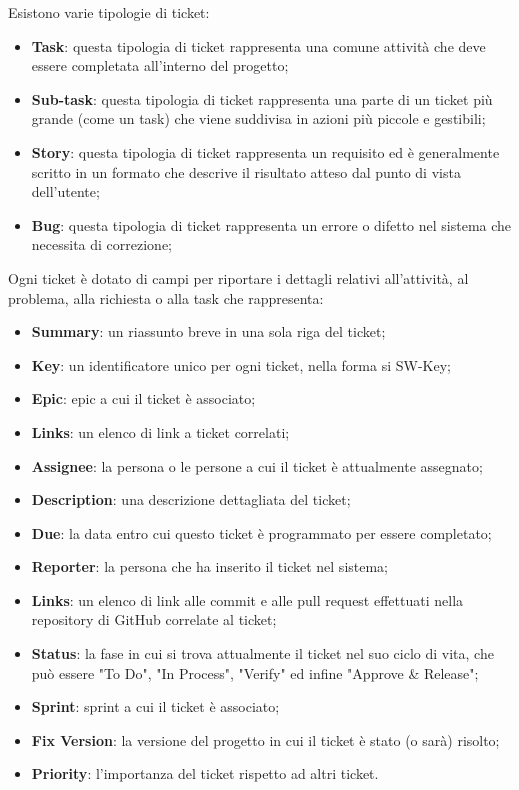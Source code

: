 Esistono varie tipologie di ticket:
\begin{itemize}
    \item \textbf{Task}: questa tipologia di ticket rappresenta una comune attività che deve essere completata all'interno del progetto;
    \item \textbf{Sub-task}: questa tipologia di ticket rappresenta una parte di un ticket più grande (come un task) che viene suddivisa in azioni più piccole e gestibili;
    \item \textbf{Story}: questa tipologia di ticket rappresenta un requisito ed è generalmente scritto in un formato che descrive il risultato atteso dal punto di vista dell'utente;
    \item \textbf{Bug}: questa tipologia di ticket rappresenta un errore o difetto nel sistema che necessita di correzione;
\end{itemize}
Ogni ticket è dotato di campi per riportare i dettagli relativi all'attività, al problema, alla richiesta o alla task che rappresenta:
\begin{itemize}
    \item \textbf{Summary}: un riassunto breve in una sola riga del ticket;
    \item \textbf{Key}: un identificatore unico per ogni ticket, nella forma si SW-Key;
    \item \textbf{Epic}: epic a cui il ticket è associato;
    \item \textbf{Links}: un elenco di link a ticket correlati;
    \item \textbf{Assignee}: la persona o le persone a cui il ticket è attualmente assegnato;
    \item \textbf{Description}: una descrizione dettagliata del ticket;
    \item \textbf{Due}: la data entro cui questo ticket è programmato per essere completato;
    \item \textbf{Reporter}: la persona che ha inserito il ticket nel sistema;
    \item \textbf{Links}: un elenco di link alle commit e alle pull request effettuati nella repository di GitHub correlate al ticket;
    \item \textbf{Status}: la fase in cui si trova attualmente il ticket nel suo ciclo di vita, che può essere "To Do", "In Process", "Verify" ed infine "Approve \& Release";
    \item \textbf{Sprint}: sprint a cui il ticket è associato;
    \item \textbf{Fix Version}: la versione del progetto in cui il ticket è stato (o sarà) risolto;
    \item \textbf{Priority}: l'importanza del ticket rispetto ad altri ticket.
\end{itemize}
